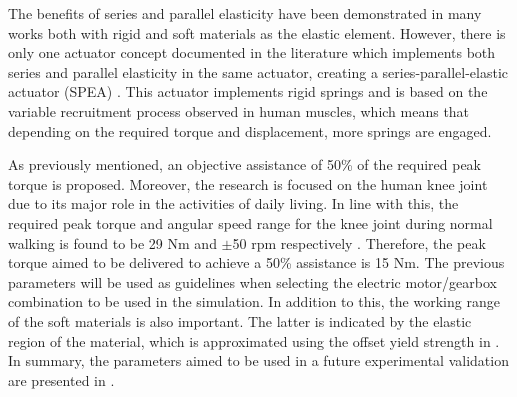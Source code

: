 The benefits of series and parallel elasticity have been demonstrated in many works both with rigid and soft materials as the elastic element. However, there is only one actuator concept documented in the literature which implements both series and parallel elasticity in the same actuator, creating a series-parallel-elastic actuator (SPEA) \cite{mathijssen2014variable}. This actuator implements rigid springs and is based on the variable recruitment process observed in human muscles, which means that depending on the required torque and displacement, more springs are engaged.

As previously mentioned, an objective assistance of 50\% of the required peak torque is proposed. Moreover, the research is focused on the human knee joint due to its major role in the activities of daily living. In line with this, the required peak torque and angular speed range for the knee joint during normal walking is found to be 29 Nm and $\pm$50 rpm respectively \cite{dos2014impedance,winter2009biomechanics}. Therefore, the peak torque aimed to be delivered to achieve a 50\% assistance is 15 Nm. The previous parameters will be used as guidelines when selecting the electric motor/gearbox combination to be used in the simulation. In addition to this, the working range of the soft materials is also important. The latter is indicated by the elastic region of the material, which is approximated using the offset yield strength in . In summary, the parameters aimed to be used in a future experimental validation are presented in .

